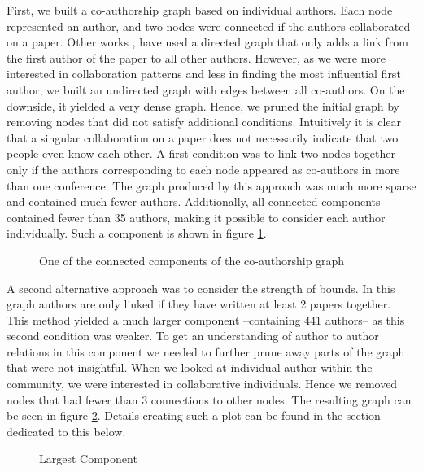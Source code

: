 \documentclass[article,twocolumn]{IEEEtran}
\begin{document}
First, we built a co-authorship graph based on individual authors. Each
node represented an author, and two nodes were connected if the authors
collaborated on a paper. Other works \cite{cheong2009social},
\cite{hesford2006management} have used a directed graph that only adds a
link from the first author of the paper to all other authors. However,
as we were more interested in collaboration patterns and less in finding
the most influential first author, we built an undirected graph with
edges between all co-authors. On the downside, it yielded a very dense
graph. Hence, we pruned the initial graph by removing nodes that did not
satisfy additional conditions. Intuitively it is clear that a singular
collaboration on a paper does not necessarily indicate that two people
even know each other. A first condition was to link two nodes together
only if the authors corresponding to each node appeared as co-authors in
more than one conference. The graph produced by this approach was much
more sparse and contained much fewer authors. Additionally, all
connected components contained fewer than 35 authors, making it possible
to consider each author individually. Such a component is shown in
figure \ref{fig_plot}.


    \begin{figure}
        \begin{center}\end{center}
        \caption{One of the connected components of the co-authorship graph}
        \label{fig_plot}
    \end{figure}
    
    A second alternative approach was to consider the strength of bounds. In
this graph authors are only linked if they have written at least 2
papers together. This method yielded a much larger component
--containing 441 authors-- as this second condition was weaker. To get
an understanding of author to author relations in this component we
needed to further prune away parts of the graph that were not
insightful. When we looked at individual author within the community, we
were interested in collaborative individuals. Hence we removed nodes
that had fewer than 3 connections to other nodes. The resulting graph
can be seen in figure \ref{author_collab_large}. Details creating such a
plot can be found in the section dedicated to this below.


    \begin{figure}
        \begin{center}\end{center}
        \caption{Largest Component}
        \label{author_collab_large}
    \end{figure}
    
\end{document}
